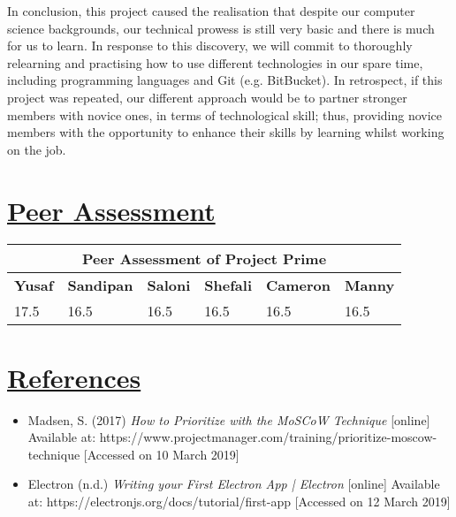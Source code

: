 \documentclass{article}
\begin{document}
\noindent In conclusion, this project caused the realisation that despite our computer science backgrounds, our technical prowess is still very basic and there is much for us to learn. In response to this discovery, we will commit to thoroughly relearning and practising how to use different technologies in our spare time, including programming languages and Git (e.g. BitBucket). In retrospect, if this project was repeated, our different approach would be to partner stronger members with novice ones, in terms of technological skill; thus, providing novice members with the opportunity to enhance their skills by learning whilst working on the job.   

\section{\underline{Peer Assessment}}
\begin{tabular}{|p{2cm}|p{2cm}|p{2cm}|p{2cm}|p{2cm}|p{2cm}|}
\hline
\multicolumn{6}{|c|}{\textbf{Peer Assessment of Project Prime}} \\
\hline
\textbf{Yusaf} & \textbf{Sandipan} & \textbf{Saloni} & \textbf{Shefali} & \textbf{Cameron} & \textbf{Manny} \\
\hline
17.5 & 16.5 & 16.5 & 16.5 & 16.5 & 16.5 \\
\hline
\end{tabular}
	
\section{\underline{References}}
\begin{itemize}
\item Madsen, S. (2017) \textit{How to Prioritize with the MoSCoW Technique} [online] Available at: https://www.projectmanager.com/training/prioritize-moscow-technique [Accessed on 10 March 2019]
\item Electron (n.d.) \textit{Writing your First Electron App | Electron} [online] Available at: https://electronjs.org/docs/tutorial/first-app [Accessed on 12 March 2019]
\end{itemize}
\end{document}

